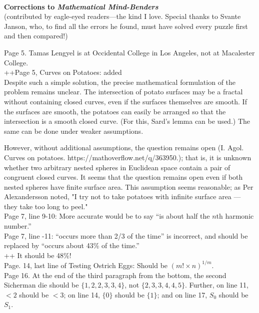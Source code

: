 \documentclass[11pt]{article}
\newlength{\originalbase}
\newcommand{\spacing}[1]{\setlength{\baselineskip}{#1\originalbase}}
\begin{document}
\spacing{1}

~

\begin{center}
{\bf \large Corrections to {\em Mathematical Mind-Benders}}\\[3mm]
(contributed by eagle-eyed readers---the kind I love.  Special
thanks to Svante Janson, who, to find all the errors he found,
must have solved every puzzle first and then compared!)
\end{center}

\bigskip

Page 5. Tamas Lengyel is at Occidental College in Los Angeles,
not at Macalester College.\\

++Page 5, Curves on Potatoes: added\\

Despite such a simple solution, the precise mathematical formulation of the problem remains unclear. The intersection of potato surfaces may be a fractal without containing closed curves, even if the surfaces themselves are smooth. If the surfaces are smooth, the potatoes can easily be arranged so that the intersection is a smooth closed curve. (For this, Sard's lemma can be used.) The same can be done under weaker assumptions.

However, without additional assumptions, the question remains open (I. Agol. Curves on potatoes. https://mathoverflow.net/q/363950.); that is, it is unknown whether two arbitrary nested spheres in Euclidean space contain a pair of congruent closed curves. It seems that the question remains open even if both nested spheres have finite surface area. This assumption seems reasonable; as Per Alexandersson noted, "I try not to take potatoes with infinite surface area — they take too long to peel."\\

Page 7, line 9-10: More accurate would be to say ``is about
half the $n$th harmonic number.''\\

Page 7, line -11: ``occurs more than 2/3 of the time'' is incorrect,
and should be replaced by ``occurs about 43\% of the time.''\\

++ It should be 48\%!\\

Page. 14, last line of Testing Ostrich Eggs: Should be $(m! \times n)^{1/m}$.\\

Page 16. At the end of the third paragraph from the bottom, the
second Sicherman die should be $\{1,2,2,3,3,4\}$, not $\{2,3,3,4,4,5\}$.
Further, on line 11, $<2$ should be $<3$; on line 14,
$\{0\}$ should be $\{1\}$; and on line 17, $S_0$ should be $S_1$.\\
\end{document}
